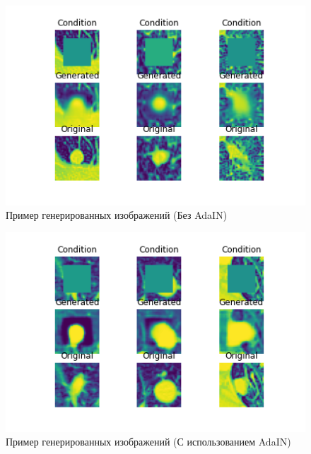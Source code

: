\begin{figure}[!h]
\includegraphics[width=\linewidth]{no-adain.png}
\caption{Пример генерированных изображений (Без AdaIN)}\label{cgan-baseline-results}
\centering
\end{figure}

\begin{figure}[!h]
\includegraphics[width=\linewidth]{adain.png}
\caption{Пример генерированных изображений (С использованием AdaIN)}\label{cgan-adain-results}
\centering
\end{figure}